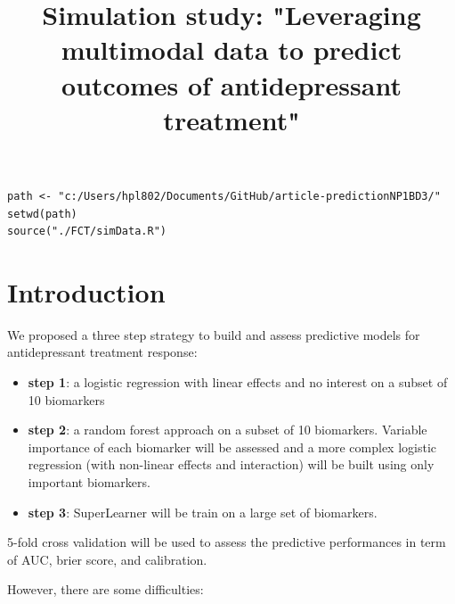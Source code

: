 \documentclass[12pt]{article}
\date{}
\title{Simulation study: "Leveraging multimodal data to predict outcomes of antidepressant treatment"}
\begin{document}
\maketitle
\lstset{language=r,label= ,caption= ,captionpos=b,numbers=none}
\begin{lstlisting}
path <- "c:/Users/hpl802/Documents/GitHub/article-predictionNP1BD3/"
setwd(path)
source("./FCT/simData.R")
\end{lstlisting}

\section{Introduction}
\label{sec:org189e802}

We proposed a three step strategy to build and assess predictive
models for antidepressant treatment response:
\begin{itemize}
\item \textbf{step 1}: a logistic regression with linear effects and no interest
on a subset of 10 biomarkers
\item \textbf{step 2}: a random forest approach on a subset of 10
biomarkers. Variable importance of each biomarker will be assessed
and a more complex logistic regression (with non-linear effects and
interaction) will be built using only important biomarkers.
\item \textbf{step 3}: SuperLearner will be train on a large set of biomarkers.
\end{itemize}

5-fold cross validation will be used to assess the predictive
performances in term of AUC, brier score, and calibration.

\bigskip

However, there are some difficulties:
\end{document}
